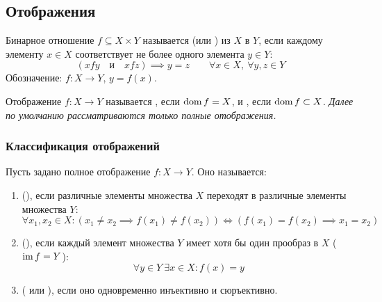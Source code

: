 \subsection{Отображения}

\begin{definition}
    Бинарное отношение $f \subseteq X \times Y$ называется 
     (или ) из $X$ в $Y$, если 
    каждому элементу $x \in X$ соответствует не более одного элемента 
    $y \in Y$:
    \begin{equation} \label{eq:map_def}
        (x f y \quad \text{и} \quad x f z) \implies y = z \qquad 
        \forall x \in X, \ \forall y, z \in Y \tag{7}
    \end{equation}
    Обозначение: $f: X \to Y$, $y = f(x)$.
\end{definition}

\begin{definition}
    Отображение $f: X \to Y$ называется , если $\operatorname{dom} f = X$, и , если 
    $\operatorname{dom} f \subset X$. \emph{Далее по умолчанию рассматриваются только 
    полные отображения.}
\end{definition}

\subsubsection{Классификация отображений}

\begin{definition}
    Пусть задано полное отображение $f: X \to Y$. Оно называется:
    \begin{enumerate}
        \item {} (), если различные 
        элементы множества $X$ переходят в различные элементы множества $Y$:
        \[
            \forall x_1, x_2 \in X : 
            (x_1 \neq x_2 \implies f(x_1) \neq f(x_2)) \iff 
            (f(x_1) = f(x_2) \implies x_1 = x_2)
        \]
        \item {} (), если каждый 
        элемент множества $Y$ имеет хотя бы один прообраз в $X$ 
        ($\operatorname{im} f = Y$):
        \[
            \forall y \in Y \ \exists x \in X : f(x) = y
        \]
        \item {} ( или ), если оно одновременно инъективно и 
        сюръективно.
    \end{enumerate}
\end{definition}

